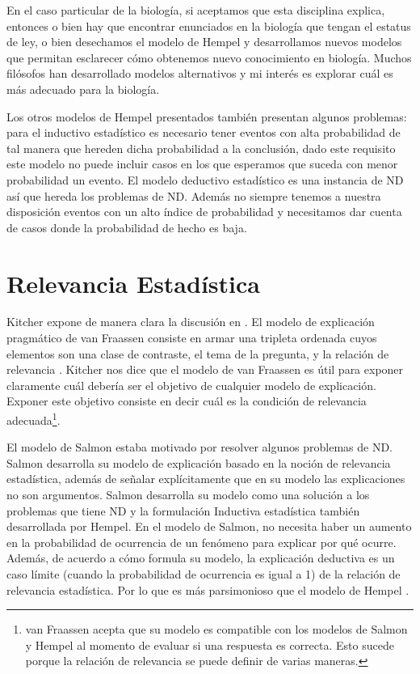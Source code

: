 En el caso particular de la biología, si aceptamos que esta disciplina explica, entonces o bien hay que encontrar enunciados en la biología que tengan el estatus de ley, o bien  desechamos el modelo de Hempel y desarrollamos nuevos modelos que permitan esclarecer cómo obtenemos nuevo conocimiento en biología. Muchos filósofos han desarrollado modelos alternativos y mi interés es explorar cuál es más adecuado para la biología.

Los otros modelos de Hempel presentados también presentan algunos problemas: para el inductivo estadístico es necesario tener eventos con alta probabilidad de tal manera que hereden dicha probabilidad a la conclusión, dado este requisito este modelo no puede incluir casos en los que esperamos que suceda con menor probabilidad un evento. El modelo deductivo estadístico es una instancia de ND así que hereda los problemas de ND.  Además no siempre tenemos a nuestra disposición eventos con un alto índice de probabilidad y necesitamos dar cuenta de casos donde la probabilidad de hecho es baja.

\section{Relevancia Estadística}

\noindent Kitcher expone de manera clara la discusión en \citeyear{Kitcher2002}. El modelo de explicación pragmático de van Fraassen consiste en armar una tripleta ordenada cuyos elementos son una clase de contraste, el tema de la pregunta, y la relación de relevancia \cite{Fraassen1977}. Kitcher nos dice que el modelo de van Fraassen es útil para exponer claramente cuál debería ser el objetivo de cualquier modelo de explicación. Exponer este objetivo consiste en decir cuál es la condición de relevancia adecuada\footnote{van Fraassen acepta que su modelo es compatible con los modelos de Salmon y Hempel al momento de evaluar si una respuesta es correcta. Esto sucede porque la relación de relevancia se puede definir de varias maneras\cite{Fraassen}.}.

El modelo de Salmon estaba motivado por resolver algunos problemas de ND. Salmon desarrolla su modelo de explicación basado en la noción de relevancia estadística, además de señalar explícitamente que en su modelo las explicaciones no son argumentos. Salmon desarrolla su modelo como una solución a los problemas que tiene ND y la formulación Inductiva estadística también desarrollada por Hempel. En el modelo de Salmon, no necesita haber un aumento en la probabilidad de ocurrencia de un fenómeno para explicar por qué ocurre. Además, de acuerdo a cómo formula su modelo, la explicación deductiva es un caso límite (cuando la probabilidad de ocurrencia es igual a 1) de la relación de relevancia estadística. Por lo que es más parsimonioso que el modelo de Hempel \cite{Salmon1970}.

